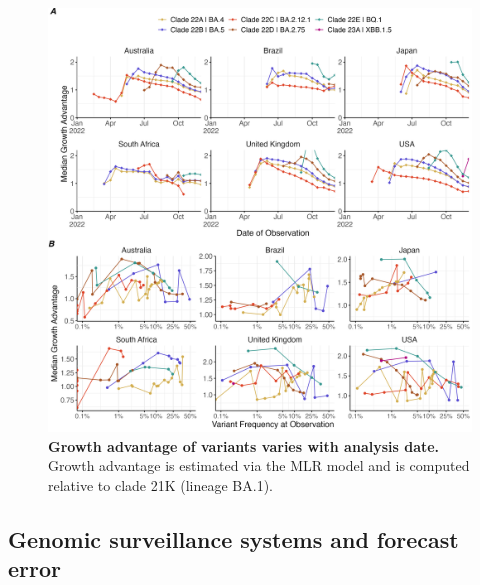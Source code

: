 \documentclass[11pt,oneside,letterpaper]{article}
\begin{document}
\begin{figure}[tb!]
	\centering
    \includegraphics[width=1.0\textwidth]{figures/ga_estimates.png}
	\caption{
		\textbf{Growth advantage of variants varies with analysis date.}
		Growth advantage is estimated via the MLR model and is computed relative to clade 21K (lineage BA.1).
	}
	\label{fig:ga_estimates}
\end{figure}

\subsection*{Genomic surveillance systems and forecast error}
\end{document}
